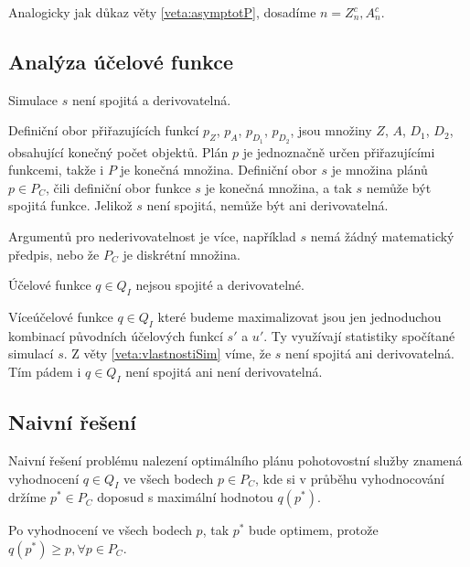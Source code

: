 \begin{dukaz}
  Analogicky jak důkaz věty \ref{veta:asymptotP}, dosadíme $n = Z^c_n, A^c_n$.
\end{dukaz}

\subsection{Analýza účelové funkce}\label{kap:analVicF}

\begin{veta}\label{veta:vlastnostiSim}
  Simulace $s$ není spojitá a derivovatelná.
\end{veta}

\begin{dukaz}
  Definiční obor přiřazujících funkcí $p_Z$, $p_A$, $p_{D_{1}}$, $p_{D_{2}}$, jsou množiny $Z$, $A$, $D_1$, $D_2$, obsahující konečný počet objektů.
  Plán $p$ je jednoznačně určen přiřazujícími funkcemi, takže i $P$ je konečná množina.
  Definiční obor $s$ je množina plánů $p \in P_C$, čili definiční obor funkce $s$ je konečná množina, a tak $s$ nemůže být spojitá funkce.
  Jelikož $s$ není spojitá, nemůže být ani derivovatelná.

  Argumentů pro nederivovatelnost je více, například $s$ nemá žádný matematický předpis, nebo že $P_C$ je diskrétní množina.
\end{dukaz}

\begin{veta}\label{veta:nespANedevQ}
  Účelové funkce $q \in Q_I$ nejsou spojité a derivovatelné.
\end{veta}

\begin{dukaz}
  Víceúčelové funkce $q \in Q_I$ které budeme maximalizovat jsou jen jednoduchou kombinací původních účelových funkcí $s'$ a $u'$.
  Ty využívají statistiky spočítané simulací $s$.
  Z věty \ref{veta:vlastnostiSim} víme, že $s$ není spojitá ani derivovatelná.
  Tím pádem i $q \in Q_I$ není spojitá ani není derivovatelná.
\end{dukaz}

\subsection{Naivní řešení}\label{kap:naivniRes}

\begin{definice}\label{df:naivniRes}
  Naivní řešení problému nalezení optimálního plánu pohotovostní služby znamená vyhodnocení $q \in Q_I$ ve všech bodech $p \in P_C$,
  kde si v průběhu vyhodnocování držíme $p^* \in P_C$ doposud s maximální hodnotou $q(p^*)$.

  Po vyhodnocení ve všech bodech $p$, tak $p^*$ bude optimem, protože $q(p^*) \geq p, \forall p \in P_C$.
\end{definice}

